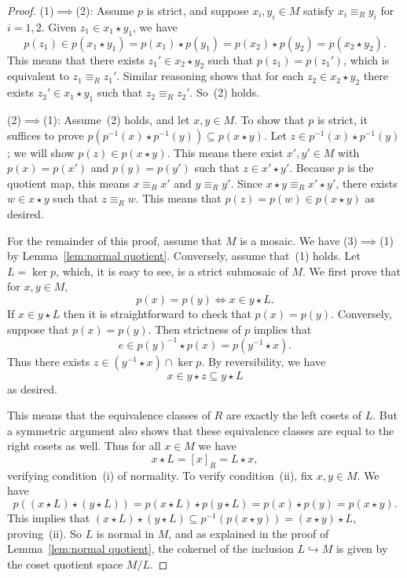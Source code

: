 \documentclass[reqno]{amsart}
\numberwithin{equation}{section}
\theoremstyle{plain}
\theoremstyle{definition}
\begin{document}
\begin{proof}
(1)$\implies$(2): Assume $p$ is strict, and suppose $x_i, y_i \in M$ satisfy $x_i \equiv_R y_i$ for $i = 1,2$. Given $z_1 \in x_1 \star y_1$, we have 
\[
p(z_1) \in p(x_1 \star y_1) = p(x_1) \star p(y_1) = p(x_2) \star p(y_2) = p(x_2 \star y_2).
\]
This means that there exists $z_1' \in x_2 \star y_2$ such that $p(z_1) = p(z_1')$, which is equivalent to $z_1 \equiv_R z_1'$. Similar reasoning shows that for each $z_2 \in x_2 \star y_2$ there exists $z_2' \in x_1 \star y_1$ such that $z_2 \equiv_R z_2'$. So~(2) holds.

(2)$\implies$(1): Assume~(2) holds, and let $x,y \in M$. To show that $p$ is strict, it suffices to prove $p(p^{-1}(x) \star p^{-1}(y)) \subseteq p(x \star y)$. Let $z \in p^{-1}(x) \star p^{-1}(y)$; we will show $p(z) \in p(x \star y)$. This means there exist $x',y' \in M$ with $p(x) = p(x')$ and $p(y) = p(y')$ such that $z \in x' \star y'$. Because $p$ is the quotient map, this means $x \equiv_R x'$ and $y \equiv_R y'$. Since $x \star y \equiv_R x'\star y'$, there exists $w \in x \star y$ such that $z \equiv_R w$. This means that $p(z) = p(w) \in p(x \star y)$ as desired.

For the remainder of this proof, assume that $M$ is a mosaic. We have (3)$\implies$(1) by Lemma~\ref{lem:normal quotient}. Conversely, assume that~(1) holds. 
Let $L = \ker p$, which, it is easy to see, is a strict submosaic of $M$. We first prove that for $x,y \in M$,
\[
p(x) = p(y) \iff x \in y \star L.
\]
If $x \in y \star L$ then it is straightforward to check that $p(x) = p(y)$. Conversely, suppose that $p(x) = p(y)$. Then strictness of $p$ implies that
\[
e \in p(y)^{-1} \star p(x) = p(y^{-1} \star x).
\]
Thus there exists $z \in (y^{-1} \star x) \cap \ker p$. By reversibility, we have 
\[
x \in y \star z \subseteq y \star L
\]
as desired.

This means that the equivalence classes of $R$ are exactly the left cosets of $L$. But a symmetric argument also shows that these equivalence classes are equal to the right cosets as well. Thus for all $x \in M$ we have
\[
x \star L = [x]_R = L \star x,
\]
verifying condition~(i) of normality. To verify condition~(ii), fix $x,y \in M$. We have
\[
p((x \star L) \star (y \star L)) = p(x \star L) \star p(y \star L) = p(x) \star p(y) = p(x \star y).
\]
This implies that $(x \star L) \star (y \star L) \subseteq p^{-1}(p(x \star y)) = (x \star y) \star L$, proving~(ii). So $L$ is normal in $M$, and as explained in the proof of Lemma~\ref{lem:normal quotient}, the cokernel of the inclusion $L \hookrightarrow M$ is given by the coset quotient space $M/L$.
\end{proof}
\end{document}
